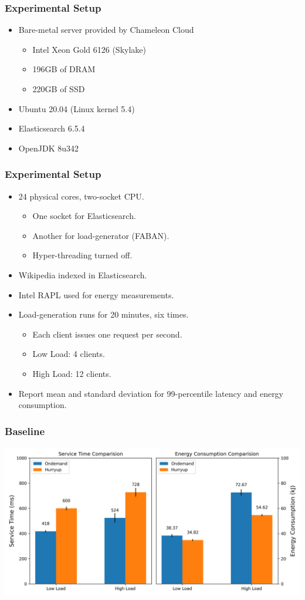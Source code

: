 \documentclass{beamer}
\begin{document}
\begin{frame}
\frametitle{Experimental Setup}
\begin{itemize}
\item Bare-metal server provided by Chameleon Cloud
\begin{itemize}
\item Intel Xeon Gold 6126 (Skylake)
\item 196GB of DRAM
\item 220GB of SSD
\end{itemize}
\item Ubuntu 20.04 (Linux kernel 5.4)
\item Elasticsearch 6.5.4
\item OpenJDK 8u342
\end{itemize}
\end{frame}

\begin{frame}
\frametitle{Experimental Setup}
\begin{itemize}
\item<1-> 24 physical cores, two-socket CPU.
\begin{itemize}
\item One socket for Elasticsearch.
\item Another for load-generator (FABAN).
\item Hyper-threading turned off.
\end{itemize}
\item<2-> Wikipedia indexed in Elasticsearch.
\item<3-> Intel RAPL used for energy measurements.
\item<4-> Load-generation runs for 20 minutes, six times.
\begin{itemize}
\item Each client issues one request per second.
\item Low Load: 4 clients.
\item High Load: 12 clients.
\end{itemize}
\item<5-> Report mean and standard deviation for 99-percentile latency and energy consumption.
\end{itemize}
\end{frame}

\begin{frame}
\frametitle{Baseline}
\includegraphics[width=1.0\textwidth]{src/figure/ondem_vs_hup.png}
\end{frame}
\end{document}
